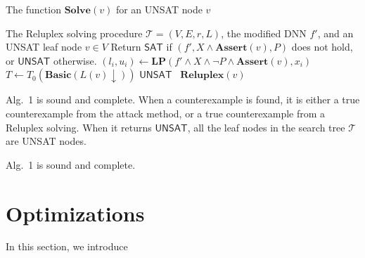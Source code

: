 \documentclass[runningheads]{llncs}
\begin{document}
\begin{algorithm}[t]
    \caption{The function $\mathbf{Solve}(v)$ for an UNSAT node $v$}
    \label{Alg:solve}
    \begin{algorithmic}[1]
        \Require
        \Statex  The Reluplex solving procedure $\mathcal T=(V,E,r,L)$, the modified DNN $f'$, and an UNSAT leaf node $v \in V$
        \Ensure
        \Statex Return $\mathsf{SAT}$ if $(f',X \wedge \mathbf{Assert}(v),P)$ does not hold, or $\mathsf{UNSAT}$ otherwise.
            
          \State  $(l_i,u_i) \gets \mathbf{LP}(f'\wedge X \wedge \neg P \wedge \mathbf{Assert}(v),x_i)$ 
            \EndFor
            \State $T \gets T_0(\mathbf{Basic}(L(v) \downarrow))$
            \State \Return $\mathsf{UNSAT}$ 
     \Else ~\Return $\mathbf{Reluplex}(v)$ 
     \EndIf
       \EndFunction
\end{algorithmic}\end{algorithm}

Alg.~1 is sound and complete. When a counterexample is found, it is either a true counterexample from the attack method, or a true counterexample from a Reluplex solving. When it returns $\mathsf{UNSAT}$, all the leaf nodes in the search tree $\mathcal T$ are UNSAT nodes.

\begin{theorem}
Alg.~1 is sound and complete. 
\end{theorem}


\section{Optimizations}

In this section, we introduce 
\end{document}
